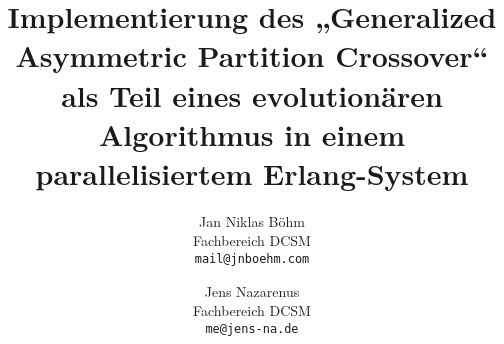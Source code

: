 \title{Implementierung des „Generalized Asymmetric Partition Crossover“
als Teil eines evolutionären Algorithmus in einem parallelisiertem
Erlang-System}

\author{Jan Niklas Böhm\\ Fachbereich DCSM\\ \texttt{mail@jnboehm.com}\\
            \and
        Jens Nazarenus\\ Fachbereich DCSM\\ \texttt{me@jens-na.de}}
